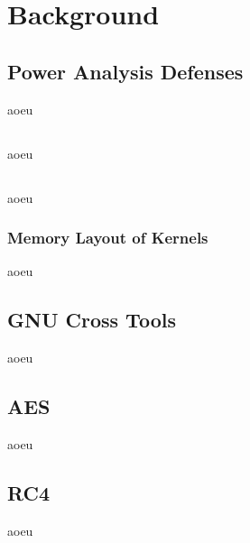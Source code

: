 \section{Background}
\label{background}
\subsection{Power Analysis Defenses}
aoeu

\subsection{\llvm{}}
\label{llvm}
aoeu

\subsection{\qemu{}}
aoeu
\subsubsection{Memory Layout of \qemu{} Kernels}
\label{memory}
aoeu

\subsection{GNU Cross Tools}
aoeu

\subsection{AES}
aoeu

\subsection{RC4}
aoeu

